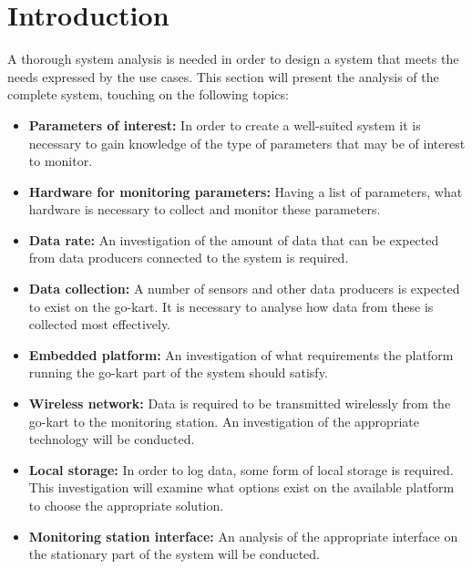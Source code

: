 \section{Introduction} %
\label{sec:system_analysis}
A thorough system analysis is needed in order to design a system that meets the needs expressed by the use cases. 
This section will present the analysis of the complete system, touching on the following topics:

\begin{itemize}
	\item  \textbf{Parameters of interest:} In order to create a well-suited system it is necessary to gain knowledge of the type of parameters that may be of interest to monitor.
	\item \textbf{Hardware for monitoring parameters:} Having a list of parameters, what hardware is necessary to collect and monitor these parameters.
	\item \textbf{Data rate:} An investigation of the amount of data that can be expected from data producers connected to the system is required.
	\item \textbf{Data collection:} A number of sensors and other data producers is expected to exist on the go-kart.
	It is necessary to analyse how data from these is collected most effectively.
	\item \textbf{Embedded platform:} An investigation of what requirements the platform running the go-kart part of the system should satisfy.
	\item \textbf{Wireless network:} Data is required to be transmitted wirelessly from the go-kart to the monitoring station.
	An investigation of the appropriate technology will be conducted.
	\item \textbf{Local storage:} In order to log data, some form of local storage is required.
	This investigation will examine what options exist on the available platform to choose the appropriate solution.
	\item \textbf{Monitoring station interface:} An analysis of the appropriate interface on the stationary part of the system will be conducted.
\end{itemize}









